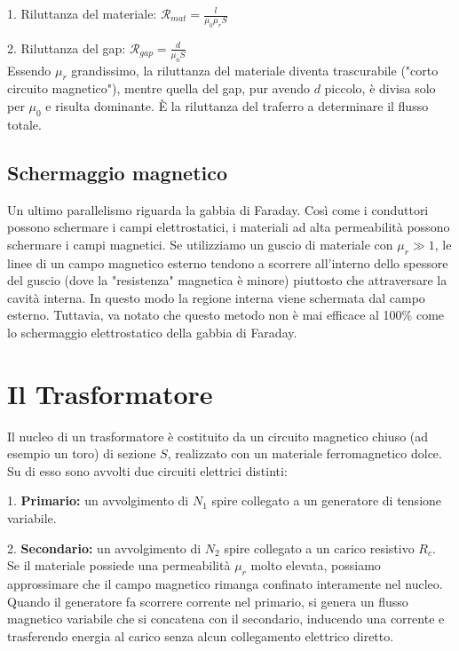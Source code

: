 \documentclass{book}
\begin{document}
1. Riluttanza del materiale: $\mathcal{R}_{mat} = \frac{l}{\mu_0 \mu_r S}$

2. Riluttanza del gap: $\mathcal{R}_{gap} = \frac{d}{\mu_0 S}$
\\
Essendo $\mu_r$ grandissimo, la riluttanza del materiale diventa trascurabile ("corto circuito magnetico"), mentre quella del gap, pur avendo $d$ piccolo, è divisa solo per $\mu_0$ e risulta dominante. È la riluttanza del traferro a determinare il flusso totale.

\subsection{Schermaggio magnetico}

Un ultimo parallelismo riguarda la gabbia di Faraday. Così come i conduttori possono schermare i campi elettrostatici, i materiali ad alta permeabilità possono schermare i campi magnetici.
Se utilizziamo un guscio di materiale con $\mu_r \gg 1$, le linee di un campo magnetico esterno tendono a scorrere all'interno dello spessore del guscio (dove la "resistenza" magnetica è minore) piuttosto che attraversare la cavità interna. In questo modo la regione interna viene schermata dal campo esterno. Tuttavia, va notato che questo metodo non è mai efficace al 100\% come lo schermaggio elettrostatico della gabbia di Faraday.

\section{Il Trasformatore}

Il nucleo di un trasformatore è costituito da un circuito magnetico chiuso (ad esempio un toro) di sezione $S$, realizzato con un materiale ferromagnetico dolce. Su di esso sono avvolti due circuiti elettrici distinti:

1.  \textbf{Primario:} un avvolgimento di $N_1$ spire collegato a un generatore di tensione variabile.

2.  \textbf{Secondario:} un avvolgimento di $N_2$ spire collegato a un carico resistivo $R_c$.
\\
Se il materiale possiede una permeabilità $\mu_r$ molto elevata, possiamo approssimare che il campo magnetico rimanga confinato interamente nel nucleo. Quando il generatore fa scorrere corrente nel primario, si genera un flusso magnetico variabile che si concatena con il secondario, inducendo una corrente e trasferendo energia al carico senza alcun collegamento elettrico diretto.
\end{document}
